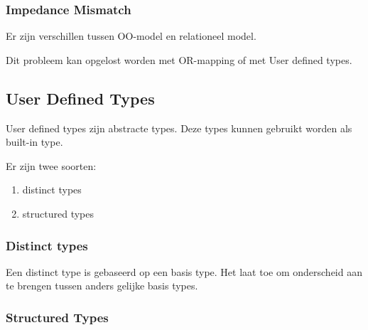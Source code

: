 \documentclass[a4paper,12pt]{article}
\begin{document}
\subsubsection{Impedance Mismatch}
Er zijn verschillen tussen OO-model en relationeel model.

Dit probleem kan opgelost worden met OR-mapping of met User defined types.

\subsection{User Defined Types}
User defined types zijn abstracte types.
Deze types kunnen gebruikt worden als built-in type.

Er zijn twee soorten:
\begin{enumerate}
\item distinct types
\item structured types
\end{enumerate}

\subsubsection{Distinct types}
Een distinct type is gebaseerd op een basis type.
Het laat toe om onderscheid aan te brengen tussen anders gelijke basis types.

\subsubsection{Structured Types}
\end{document}
